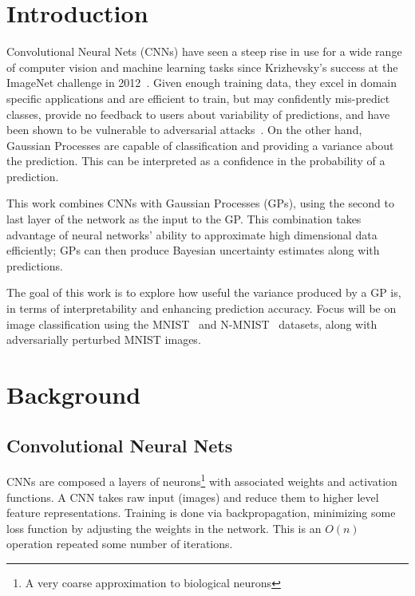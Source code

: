 \documentclass{article}
\begin{document}
\section{Introduction}
\label{sec:intro}

 
Convolutional Neural Nets (CNNs) have seen a steep rise in use for a wide range of computer vision and machine learning tasks since Krizhevsky's success at the ImageNet challenge in 2012~\cite{krizhevsky2012imagenet}. Given enough training data, they excel in domain specific applications and are efficient to train, but may confidently mis-predict classes, provide no feedback to users about variability of predictions, and have been shown to be vulnerable to adversarial attacks~\cite{szegedy2013intriguing}. On the other hand, Gaussian Processes are capable of classification and providing a variance about the prediction. This can be interpreted as a confidence in the probability of a prediction.

This work combines CNNs with Gaussian Processes (GPs), using the second to last layer of the network as the input to the GP. This combination takes advantage of neural networks' ability to approximate high dimensional data efficiently; GPs can then produce Bayesian uncertainty estimates along with predictions.

The goal of this work is to explore how useful the variance produced by a GP is, in terms of interpretability and enhancing prediction accuracy. Focus will be on image classification using the MNIST~\cite{lecun1998gradient} and N-MNIST~\cite{basu2017learning} datasets, along with adversarially perturbed MNIST images.


\section{Background}
\label{sec:background}
\subsection{Convolutional Neural Nets}
\label{sec:background:cnn}
CNNs are composed a layers of neurons\footnote{A very coarse approximation to biological neurons} with associated weights and activation functions. A CNN takes raw input (images) and reduce them to higher level feature representations. Training is done via backpropagation, minimizing some loss function by adjusting the weights in the network. This is an $O(n)$ operation repeated some number of iterations.
\end{document}
